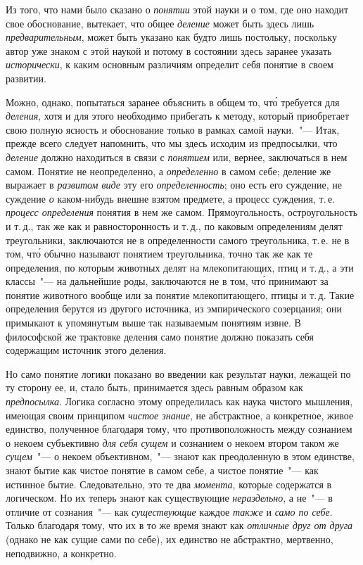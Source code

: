 Из того, что нами было сказано о \emph{понятии} этой науки
и о том, где оно находит свое обоснование, вытекает, что
общее \emph{деление} может быть здесь лишь \emph{предварительным},
может быть указано как будто лишь постольку, поскольку
автор уже знаком с этой наукой и потому в состоянии
здесь заранее указать \emph{исторически}, к каким
основным различиям определит себя понятие в своем
развитии.

Можно, однако, попытаться заранее объяснить в общем
то, чт\'о требуется для \emph{деления}, хотя и для этого
необходимо прибегать к методу, который приобретает
свою полную ясность и обоснование только в рамках
самой науки.~"--- Итак, прежде всего следует напомнить,
что мы здесь исходим из предпосылки, что \emph{деление} должно
находиться в связи с \emph{понятием} или, вернее, заключаться
в нем самом. Понятие не неопределенно, а \emph{определенно}
в самом себе; деление же выражает в \emph{развитом
виде} эту его \emph{определенность}; оно есть его суждение\endnotemark{},
не суждение \emph{о} каком-нибудь внешне взятом предмете,
а процесс суждения, т.\,е. \emph{процесс определения} понятия
в нем же самом. Прямоугольность, остроугольность и т.\,д.,
так же как и равносторонность и т.\,д., по каковым определениям
делят треугольники, заключаются не в определенности
самого треугольника, т.\,е. не в том, чт\'о обычно
называют понятием треугольника, точно так же как те
определения, по которым животных делят на млекопитающих,
птиц и т.\,д., а эти классы~"--- на дальнейшие
роды, заключаются не в том, чт\'о принимают за понятие
животного вообще или за понятие млекопитающего, птицы
и т.\,д. Такие определения берутся из другого источника,
из эмпирического созерцания; они примыкают
к упомянутым выше так называемым понятиям извне.
В философской же трактовке деления само понятие должно
показать себя содержащим источник этого деления.


Но само понятие логики показано во введении как
результат науки, лежащей по ту сторону ее, и, стало
быть, принимается здесь равным образом как \emph{предпосылка}.
Логика согласно этому определилась как наука
чистого мышления, имеющая своим принципом \emph{чистое
знание}, не абстрактное, а конкретное, живое единство,
полученное благодаря тому, что противоположность между
сознанием о некоем субъективно \emph{для себя сущем} и
сознанием о некоем втором таком же \emph{сущем}~"--- о некоем
объективном,~"--- знают как преодоленную в этом единстве,
знают бытие как чистое понятие в самом себе, а чистое
понятие~"--- как истинное бытие. Следовательно, это те два
\emph{момента}, которые содержатся в логическом. Но их теперь
знают как существующие \emph{нераздельно}, а не~"--- в отличие
от сознания~"--- как \emph{существующие} каждое \emph{также} и \emph{само
по себе}. Только благодаря тому, что их в то же время
знают как \emph{отличные друг от друга} (однако не как сущие
сами по себе), их единство не абстрактно, мертвенно, неподвижно,
а конкретно.

